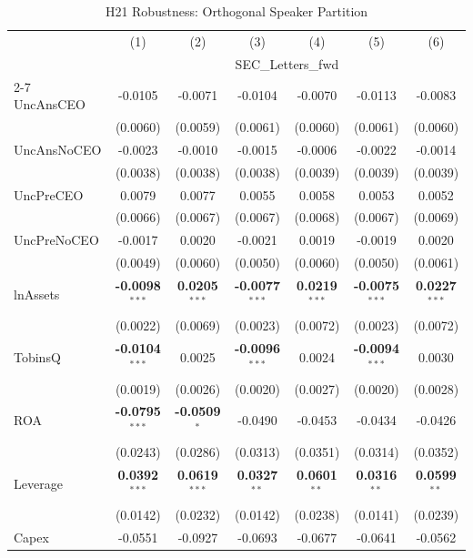 \begin{landscape}
\begin{table}[H]
\setlength{\tabcolsep}{3pt}
\renewcommand{\arraystretch}{0.85}
\centering
\caption{H21 Robustness: Orthogonal Speaker Partition}
\label{tab:h21_robust}
\scriptsize
\begin{tabular}{lcccccc}
\toprule
 & (1) & (2) & (3) & (4) & (5) & (6) \\
 & \multicolumn{6}{c}{SEC\_Letters\_fwd} \\
\cmidrule(lr){2-7}
\midrule
UncAnsCEO & -0.0105 & -0.0071 & -0.0104 & -0.0070 & -0.0113 & -0.0083 \\
 & (0.0060) & (0.0059) & (0.0061) & (0.0060) & (0.0061) & (0.0060) \\
UncAnsNoCEO & -0.0023 & -0.0010 & -0.0015 & -0.0006 & -0.0022 & -0.0014 \\
 & (0.0038) & (0.0038) & (0.0038) & (0.0039) & (0.0039) & (0.0039) \\
UncPreCEO & 0.0079 & 0.0077 & 0.0055 & 0.0058 & 0.0053 & 0.0052 \\
 & (0.0066) & (0.0067) & (0.0067) & (0.0068) & (0.0067) & (0.0069) \\
UncPreNoCEO & -0.0017 & 0.0020 & -0.0021 & 0.0019 & -0.0019 & 0.0020 \\
 & (0.0049) & (0.0060) & (0.0050) & (0.0060) & (0.0050) & (0.0061) \\
\midrule
lnAssets & \textbf{-0.0098}$^{***}$ & \textbf{0.0205}$^{***}$ & \textbf{-0.0077}$^{***}$ & \textbf{0.0219}$^{***}$ & \textbf{-0.0075}$^{***}$ & \textbf{0.0227}$^{***}$ \\
 & (0.0022) & (0.0069) & (0.0023) & (0.0072) & (0.0023) & (0.0072) \\
TobinsQ & \textbf{-0.0104}$^{***}$ & 0.0025 & \textbf{-0.0096}$^{***}$ & 0.0024 & \textbf{-0.0094}$^{***}$ & 0.0030 \\
 & (0.0019) & (0.0026) & (0.0020) & (0.0027) & (0.0020) & (0.0028) \\
ROA & \textbf{-0.0795}$^{***}$ & \textbf{-0.0509}$^{*}$ & -0.0490 & -0.0453 & -0.0434 & -0.0426 \\
 & (0.0243) & (0.0286) & (0.0313) & (0.0351) & (0.0314) & (0.0352) \\
Leverage & \textbf{0.0392}$^{***}$ & \textbf{0.0619}$^{***}$ & \textbf{0.0327}$^{**}$ & \textbf{0.0601}$^{**}$ & \textbf{0.0316}$^{**}$ & \textbf{0.0599}$^{**}$ \\
 & (0.0142) & (0.0232) & (0.0142) & (0.0238) & (0.0141) & (0.0239) \\
Capex & -0.0551 & -0.0927 & -0.0693 & -0.0677 & -0.0641 & -0.0562 \\

\end{tabular}
\end{table}
\end{landscape}
